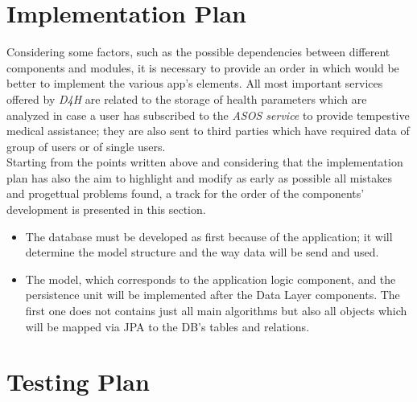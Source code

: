 \section{Implementation Plan}
Considering some factors, such as the possible dependencies between different components and modules, it is necessary to provide an order in which would be better to implement the various app's elements. All most important services offered by \textit{D4H} are related to the storage of health parameters which are analyzed in case a user has subscribed to the \textit{ASOS service} to provide tempestive medical assistance; they are also sent to third parties which have required data of group of users or of single users. \\
Starting from the points written above and considering that the implementation plan has also the aim to highlight and modify as early as possible all mistakes and progettual problems found, a track for the order of the components' development is presented in this section.

\begin{itemize}
	\item The database must be developed as first because of the application; it will determine the 	model structure and the way data will be send and used.
	\item  The model, which corresponds to the application logic component, and the persistence unit will be implemented after the 			Data Layer components. The first one does not contains just all main algorithms but also all objects which will be mapped via 		JPA to the DB's tables and relations.
\end{itemize}
\section{Testing Plan}